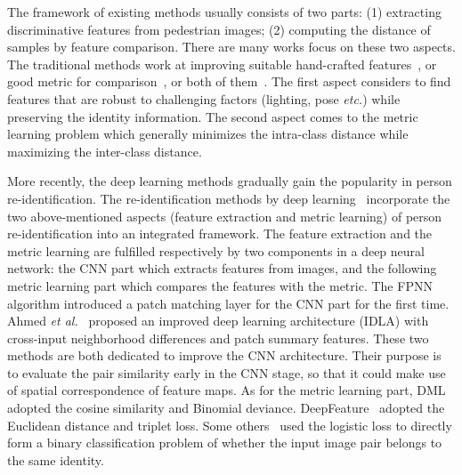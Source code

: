 \documentclass[runningheads]{llncs}
\begin{document}
The framework of existing methods usually consists of two parts: (1) extracting discriminative features from pedestrian images; (2) computing the distance of samples by feature comparison.
There are many works focus on these two aspects.
The traditional methods work at improving suitable hand-crafted features~\cite{yang2014salient,zhao2014learning}, or good metric for comparison~\cite{paisitkriangkrai2015learning,koestinger2012large,li2013locally,li2013learning,martinel2014saliency,zhao2013person,zhang2014prism,zhang2015group}, or both of them~\cite{khamis2014joint,liao2015person,xiong2014person,zhang2014novel}. The first aspect considers to find features that are robust to challenging factors (lighting, pose \emph{etc.}) while preserving the identity information. The second aspect comes to the metric learning problem which generally minimizes the intra-class distance while maximizing the inter-class distance.



More recently, the deep learning methods gradually gain the popularity in person re-identification.
The re-identification methods by deep learning~\cite{ahmed2015improved,ding2015deep,li2014deepreid,yi2014deep} incorporate the two above-mentioned aspects (feature extraction and metric learning) of person re-identification into an integrated framework.
The feature extraction and the metric learning are fulfilled respectively by two components in a deep neural network: the CNN part which extracts features from images, and the following metric learning part which compares the features with the metric.
The FPNN~\cite{li2014deepreid} algorithm introduced a patch matching layer for the CNN part for the first time. Ahmed \emph{et al.}~\cite{ahmed2015improved} proposed an improved deep learning architecture (IDLA) with cross-input neighborhood differences and patch summary features. These two methods are both dedicated to improve the CNN architecture.
Their purpose is to evaluate the pair similarity early in the CNN stage, so that it could make use of spatial correspondence of feature maps.
As for the metric learning part, DML~\cite{yi2014deep} adopted the cosine similarity and Binomial deviance.
DeepFeature~\cite{ding2015deep} adopted the Euclidean distance and triplet loss.
Some others~\cite{ahmed2015improved,li2014deepreid} used the logistic loss to directly form a binary classification problem of whether the input image pair belongs to the same identity.
\end{document}
